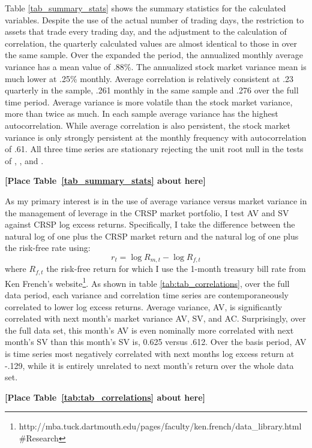 Table \ref{tab_summary_stats} shows the summary statistics for the calculated variables. Despite the use of the actual number of trading days, the restriction to assets that trade every trading day, and the adjustment to the calculation of correlation, the quarterly calculated values are almost identical to those in \citet{pollet_average_2010} over the same sample. Over the expanded the period, the annualized monthly average variance has a mean value of .88\%. The annualized stock market variance mean is much lower at .25\% monthly. Average correlation is relatively consistent at .23 quarterly in the \cite{pollet_average_2010} sample, .261 monthly in the same sample and .276 over the full time period. Average variance is more volatile than the stock market variance, more than twice as much. In each sample average variance has the highest autocorrelation. While average correlation is also persistent, the stock market variance is only strongly persistent at the monthly frequency with autocorrelation of .61. All three time series are stationary rejecting the unit root null in the tests of \citet{dickey_distribution_1979}, \citet{Ng2001}, and \citet{ers1996}.\\
\bigskip
\centerline{\bf [Place Table~\ref{tab_summary_stats} about here]}
\bigskip
As my primary interest is in the use of average variance versus market variance in the management of leverage in the CRSP market portfolio, I test AV and SV against CRSP log excess returns.
Specifically, I take the difference between the natural log of one plus the CRSP market return and the natural log of one plus the risk-free rate using:
\begin{equation}
	r_{t} = \log R_{m,t} - \log R_{f,t} 
\end{equation}
where $R_{f,t}$ the risk-free return for which I use the 1-month treasury bill rate from Ken French's website\footnote{http://mba.tuck.dartmouth.edu/pages/faculty/ken.french/data\_library.html\#Research}. As shown in table \ref{tab:tab_correlations}, over the full data period, each variance and correlation time series are contemporaneously correlated to lower log excess returns. Average variance, AV, is significantly correlated with next month's market variance AV, SV, and AC. Surprisingly, over the full data set, this month's AV is even nominally more correlated with next month's SV than this month's SV is, 0.625 versus .612. Over the basis period, AV is time series most negatively correlated with next months log excess return at -.129, while it is entirely unrelated to next month's return over the whole data set.
\bigskip
\centerline{\bf [Place Table~\ref{tab:tab_correlations} about here]}
\bigskip


